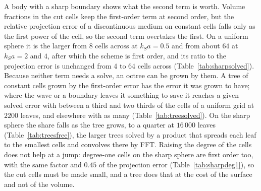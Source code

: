 \documentclass[11pt,a4paper]{article}
\begin{document}
A body with a sharp boundary shows what the second term is worth. Volume fractions in the cut cells
keep the first-order term at second order, but the relative projection error of a discontinuous medium
on constant cells falls only as the first power of the cell, so the second term overtakes the first. On
a uniform sphere it is the larger from $8$ cells across at $k_Sa=0.5$ and from about $64$ at $k_Sa=2$
and $4$, after which the scheme is first order, and its ratio to the projection error is unchanged from
$4$ to $64$ cells across (Table~\ref{tab:sharpsolved}). Because neither term needs a solve, an octree
can be grown by them. A tree of constant cells grown by the first-order error has the error it was grown
to have; where the wave or a boundary leaves it something to save it reaches a given solved error with
between a third and two thirds of the cells of a uniform grid at $2200$ leaves, and elsewhere with
as many (Table~\ref{tab:treesolved}). On the sharp sphere the share falls as the tree grows, to a quarter
at $16\,000$ leaves (Table~\ref{tab:treesfree}), the larger trees solved by a product that spreads each
leaf to the smallest cells and convolves there by FFT. Raising the degree of the cells does not help at
a jump: degree-one cells on the sharp sphere are first order too, with the same factor and $0.45$ of the
projection error (Table~\ref{tab:sharpdeg1}), so the cut cells must be made small, and a tree does that
at the cost of the surface and not of the volume.
\end{document}
